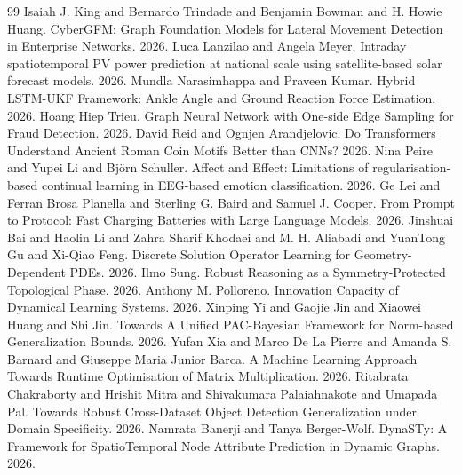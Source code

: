 \documentclass{article}
\begin{document}
\begin{thebibliography}{99}
Isaiah J. King and Bernardo Trindade and Benjamin Bowman and H. Howie Huang. CyberGFM: Graph Foundation Models for Lateral Movement Detection in Enterprise Networks. 2026.
Luca Lanzilao and Angela Meyer. Intraday spatiotemporal PV power prediction at national scale using satellite-based solar forecast models. 2026.
Mundla Narasimhappa and Praveen Kumar. Hybrid LSTM-UKF Framework: Ankle Angle and Ground Reaction Force Estimation. 2026.
Hoang Hiep Trieu. Graph Neural Network with One-side Edge Sampling for Fraud Detection. 2026.
David Reid and Ognjen Arandjelovic. Do Transformers Understand Ancient Roman Coin Motifs Better than CNNs? 2026.
Nina Peire and Yupei Li and Björn Schuller. Affect and Effect: Limitations of regularisation-based continual learning in EEG-based emotion classification. 2026.
Ge Lei and Ferran Brosa Planella and Sterling G. Baird and Samuel J. Cooper. From Prompt to Protocol: Fast Charging Batteries with Large Language Models. 2026.
Jinshuai Bai and Haolin Li and Zahra Sharif Khodaei and M. H. Aliabadi and YuanTong Gu and Xi-Qiao Feng. Discrete Solution Operator Learning for Geometry-Dependent PDEs. 2026.
Ilmo Sung. Robust Reasoning as a Symmetry-Protected Topological Phase. 2026.
Anthony M. Polloreno. Innovation Capacity of Dynamical Learning Systems. 2026.
Xinping Yi and Gaojie Jin and Xiaowei Huang and Shi Jin. Towards A Unified PAC-Bayesian Framework for Norm-based Generalization Bounds. 2026.
Yufan Xia and Marco De La Pierre and Amanda S. Barnard and Giuseppe Maria Junior Barca. A Machine Learning Approach Towards Runtime Optimisation of Matrix Multiplication. 2026.
Ritabrata Chakraborty and Hrishit Mitra and Shivakumara Palaiahnakote and Umapada Pal. Towards Robust Cross-Dataset Object Detection Generalization under Domain Specificity. 2026.
Namrata Banerji and Tanya Berger-Wolf. DynaSTy: A Framework for SpatioTemporal Node Attribute Prediction in Dynamic Graphs. 2026.
\end{thebibliography}
\end{document}
